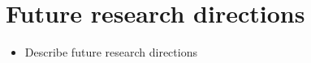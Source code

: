 \section{Future research directions}
\label{sec:future}

\begin{itemize}
    \item Describe future research directions
\end{itemize}